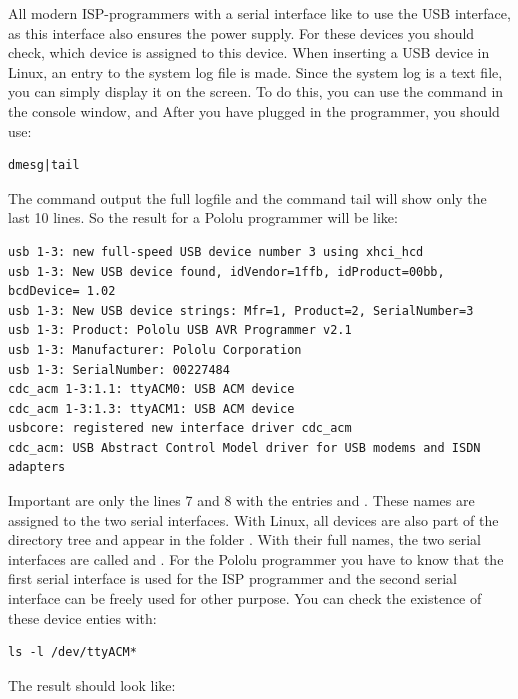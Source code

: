 All modern ISP-programmers with a serial interface like to use the USB interface,
as this interface also ensures the power supply. 
For these devices you should check, which device is assigned to this device.
When inserting a USB device in Linux, an entry to the system log file is made.
Since the system log is a text file, you can simply display it on the screen.
To do this, you can use the command  in the console window, and
After you have plugged in the programmer, you should use:
\begin{large} \vspace{-0.4em} \begin{verbatim}
dmesg|tail
\end{verbatim} \end{large}
The  command output the full logfile and the command tail will show only the
last 10 lines. So the result for a Pololu programmer will be like:
\begin{footnotesize} \begin{verbatim}
usb 1-3: new full-speed USB device number 3 using xhci_hcd
usb 1-3: New USB device found, idVendor=1ffb, idProduct=00bb, bcdDevice= 1.02
usb 1-3: New USB device strings: Mfr=1, Product=2, SerialNumber=3
usb 1-3: Product: Pololu USB AVR Programmer v2.1
usb 1-3: Manufacturer: Pololu Corporation
usb 1-3: SerialNumber: 00227484
cdc_acm 1-3:1.1: ttyACM0: USB ACM device
cdc_acm 1-3:1.3: ttyACM1: USB ACM device
usbcore: registered new interface driver cdc_acm
cdc_acm: USB Abstract Control Model driver for USB modems and ISDN adapters
\end{verbatim} \end{footnotesize}
Important are only the lines 7 and 8 with the entries  and .
These names are assigned to the two serial interfaces.
With Linux, all devices are also part of the directory tree and appear in the
folder .
With their full names, the two serial interfaces are called  and
.
For the Pololu programmer you have to know that the first serial interface is used for
the ISP programmer and the second serial interface can be freely used for other purpose.
You can check the existence of these device enties with:
\begin{large} \vspace{-0.4em} \begin{verbatim}
ls -l /dev/ttyACM*
\end{verbatim} \end{large}
The result should look like:
